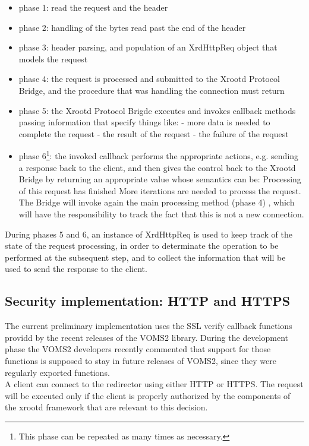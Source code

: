 \documentclass[12pt]{article} %
\begin{document}
\begin{itemize}

\item phase 1: read the request and the header
\item phase 2: handling of the bytes read past the end of the header
\item phase 3: header parsing, and population of an XrdHttpReq object that models the request
\item phase 4: the request is processed and submitted to the Xrootd Protocol Bridge, and the procedure that was handling the connection must return
\item phase 5: the Xrootd Protocol Brigde executes and invokes callback methods passing information that specify things like:
  \subitem - more data is needed to complete the request
  \subitem - the result of the request
  \subitem - the failure of the request
\item phase 6\footnote{This phase can be repeated as many times as necessary.}: the invoked callback performs the appropriate actions, e.g. sending a response back to the client, and then gives the control back to the Xrootd Bridge by returning an appropriate value whose semantics can be:
  \subitem Processing of this request has finished
  \subitem More iterations are needed to process the request. The Bridge will invoke again the main processing method (phase 4) , which will have the responsibility to track the fact that this is not a new connection.

\end{itemize}

 During phases 5 and 6, an instance of XrdHttpReq is used to keep track of the state of the request processing, in order to determinate the operation to be performed at the subsequent step, and to collect the information that will be used to send the response to the client.


\subsection{Security implementation: HTTP and HTTPS}

The current preliminary implementation uses the SSL verify callback functions providd by the recent releases of the VOMS2 library. During the development phase the VOMS2 developers recently commented that support for those functions is supposed to stay in future releases of VOMS2, since they were regularly exported functions.\\
A client can connect to the redirector using either HTTP or HTTPS. The request will be executed only if the client is properly authorized by the components of the xrootd framework that are relevant to this decision.
\end{document}
